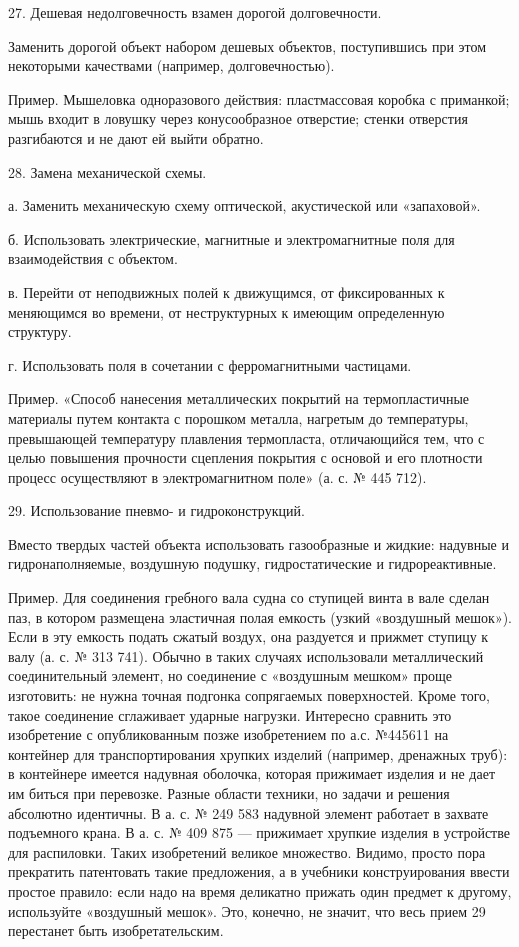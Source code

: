 27. Дешевая недолговечность взамен дорогой долговечности.

Заменить  дорогой объект  набором дешевых  объектов, поступившись  при
этом некоторыми качествами (например, долговечностью).


Пример.  Мышеловка  одноразового  действия:  пластмассовая  коробка  с
приманкой;  мышь  входит  в ловушку  через  конусообразное  отверстие;
стенки отверстия разгибаются и не дают ей выйти обратно.

28. Замена механической схемы.

а.   Заменить   механическую   схему  оптической,   акустической   или
«запаховой».

б. Использовать  электрические, магнитные и электромагнитные  поля для
взаимодействия с объектом.

в.  Перейти  от  неподвижных  полей  к  движущимся,  от  фиксированных
к  меняющимся  во времени,  от  неструктурных  к имеющим  определенную
структуру.

г. Использовать поля в сочетании с ферромагнитными частицами.

Пример.  «Способ нанесения  металлических покрытий  на термопластичные
материалы путем контакта с  порошком металла, нагретым до температуры,
превышающей температуру плавления термопласта, отличающийся тем, что с
целью повышения прочности сцепления покрытия с основой и его плотности
процесс осуществляют в электромагнитном поле» (а. с. № 445 712).

29. Использование пневмо- и гидроконструкций.

Вместо  твердых частей  объекта  использовать  газообразные и  жидкие:
надувные  и гидронаполняемые,  воздушную  подушку, гидростатические  и
гидрореактивные.

Пример. Для  соединения гребного вала  судна со ступицей винта  в вале
сделан  паз,  в  котором  размещена эластичная  полая  емкость  (узкий
«воздушный  мешок»). Если  в  эту емкость  подать  сжатый воздух,  она
раздуется  и прижмет  ступицу  к валу  (а.  с. №  313  741). Обычно  в
таких  случаях использовали  металлический соединительный  элемент, но
соединение  с «воздушным  мешком»  проще изготовить:  не нужна  точная
подгонка  сопрягаемых  поверхностей.   Кроме  того,  такое  соединение
сглаживает  ударные нагрузки.  Интересно  сравнить  это изобретение  с
опубликованным  позже изобретением  по а.с.  №445611 на  контейнер для
транспортирования  хрупких  изделий   (например,  дренажных  труб):  в
контейнере имеется  надувная оболочка, которая прижимает  изделия и не
дает  им биться  при перевозке.  Разные области  техники, но  задачи и
решения  абсолютно идентичны.  В  а.  с. №  249  583 надувной  элемент
работает в  захвате подъемного крана.  В а. с.  № 409 875  — прижимает
хрупкие  изделия  в  устройстве   для  распиловки.  Таких  изобретений
великое множество.  Видимо, просто  пора прекратить  патентовать такие
предложения, а в учебники конструирования ввести простое правило: если
надо на  время деликатно прижать  один предмет к  другому, используйте
«воздушный  мешок».  Это,  конечно,  не  значит,  что  весь  прием  29
перестанет быть изобретательским.

